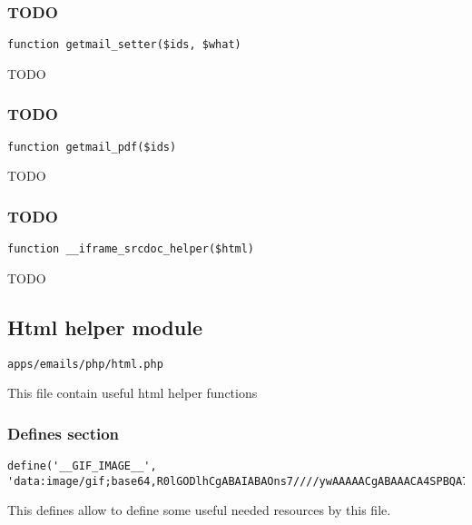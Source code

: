 \documentclass[a4paper]{article}
\begin{document}
\hypertarget{toc104}{}
\subsubsection{TODO}

\begin{lstlisting}
function getmail_setter($ids, $what)
\end{lstlisting}

TODO

\hypertarget{toc105}{}
\subsubsection{TODO}

\begin{lstlisting}
function getmail_pdf($ids)
\end{lstlisting}

TODO

\hypertarget{toc106}{}
\subsubsection{TODO}

\begin{lstlisting}
function __iframe_srcdoc_helper($html)
\end{lstlisting}

TODO

\hypertarget{toc107}{}
\subsection{Html helper module}

\begin{lstlisting}
apps/emails/php/html.php
\end{lstlisting}

This file contain useful html helper functions

\hypertarget{toc108}{}
\subsubsection{Defines section}

\begin{lstlisting}
define('__GIF_IMAGE__', 'data:image/gif;base64,R0lGODlhCgABAIABAOns7////ywAAAAACgABAAACA4SPBQA7');
\end{lstlisting}

This defines allow to define some useful needed resources by this file.

\hypertarget{toc109}{}
\end{document}
